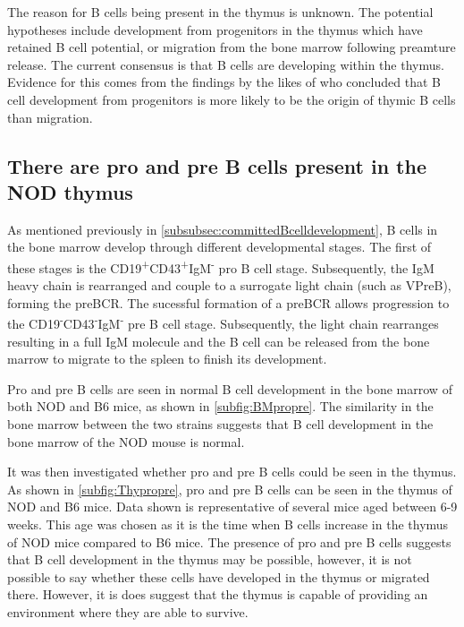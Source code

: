 The reason for B cells being present in the thymus is unknown. 
The potential hypotheses include development from progenitors in the thymus which have retained B cell potential, or migration from the bone marrow following preamture release.
The current consensus is that B cells are developing within the thymus. Evidence for this comes from the findings by the likes of \citet{Perrera2013} who concluded that B cell development from progenitors is more likely to be the origin of thymic B cells than migration.


\subsection{There are pro and pre B cells present in the NOD thymus}
\label{subsec:proandpre}


As mentioned previously in \cref{subsubsec:committedBcelldevelopment}, B cells in the bone marrow develop through different developmental stages.
The first of these stages is the CD19\textsuperscript{+}CD43\textsuperscript{+}IgM\textsuperscript{-} pro B cell stage.
Subsequently, the IgM heavy chain is rearranged and couple to a surrogate light chain (such as VPreB), forming the preBCR.
The sucessful formation of a preBCR allows progression to the CD19\textsuperscript{-}CD43\textsuperscript{-}IgM\textsuperscript{-} pre B cell stage.
Subsequently, the light chain rearranges resulting in a full IgM molecule and the B cell can be released from the bone marrow to migrate to the spleen to finish its development.

Pro and pre B cells are seen in normal B cell development in the bone marrow of both NOD and B6 mice, as shown in \cref{subfig:BMpropre}.
The similarity in the bone marrow between the two strains suggests that B cell development in the bone marrow of the NOD mouse is normal.

It was then investigated whether pro and pre B cells could be seen in the thymus.
As shown in \cref{subfig:Thypropre}, pro and pre B cells can be seen in the thymus of NOD and B6 mice.
Data shown is representative of several mice aged between 6-9 weeks.
This age was chosen as it is the time when B cells increase in the thymus of NOD mice compared to B6 mice.
The presence of pro and pre B cells suggests that B cell development in the thymus may be possible, however, it is not possible to say whether these cells have developed in the thymus or migrated there.
However, it is does suggest that the thymus is capable of providing an environment where they are able to survive.

